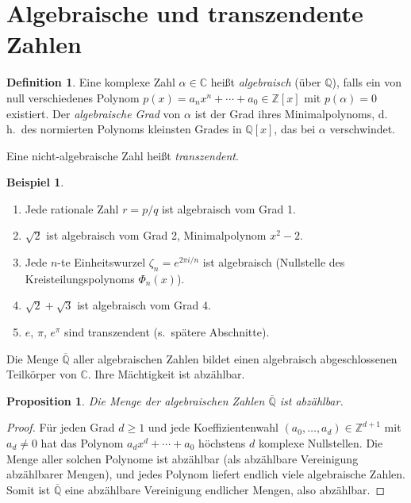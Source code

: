 \documentclass[12pt,a4paper]{amsart}
\newtheorem{proposition}[theorem]{Proposition}
\theoremstyle{definition}
\newtheorem{definition}[theorem]{Definition}
\newtheorem{beispiel}[theorem]{Beispiel}
\begin{document}
\section{Algebraische und transzendente Zahlen}
\label{sec:alg-transz}

\begin{definition}
Eine komplexe Zahl $\alpha \in \mathbb{C}$ heißt \emph{algebraisch} (über
$\mathbb{Q}$), falls ein von null verschiedenes Polynom $p(x) = a_n x^n +
\cdots + a_0 \in \mathbb{Z}[x]$ mit $p(\alpha) = 0$ existiert. Der
\emph{algebraische Grad} von $\alpha$ ist der Grad ihres Minimalpolynoms,
d.\,h.\ des normierten Polynoms kleinsten Grades in $\mathbb{Q}[x]$, das bei
$\alpha$ verschwindet.

Eine nicht-algebraische Zahl heißt \emph{transzendent}.
\end{definition}

\begin{beispiel}
\begin{enumerate}[label=(\roman*)]
  \item Jede rationale Zahl $r = p/q$ ist algebraisch vom Grad 1.
  \item $\sqrt{2}$ ist algebraisch vom Grad 2, Minimalpolynom $x^2 - 2$.
  \item Jede $n$-te Einheitswurzel $\zeta_n = e^{2\pi i/n}$ ist algebraisch
        (Nullstelle des Kreisteilungspolynoms $\Phi_n(x)$).
  \item $\sqrt{2} + \sqrt{3}$ ist algebraisch vom Grad 4.
  \item $e$, $\pi$, $e^\pi$ sind transzendent (s.\ spätere Abschnitte).
\end{enumerate}
\end{beispiel}

Die Menge $\overline{\mathbb{Q}}$ aller algebraischen Zahlen bildet einen
algebraisch abgeschlossenen Teilkörper von $\mathbb{C}$. Ihre Mächtigkeit
ist abzählbar.

\begin{proposition}
Die Menge der algebraischen Zahlen $\overline{\mathbb{Q}}$ ist abzählbar.
\end{proposition}
\begin{proof}
Für jeden Grad $d \geq 1$ und jede Koeffizientenwahl $(a_0, \ldots, a_d) \in
\mathbb{Z}^{d+1}$ mit $a_d \neq 0$ hat das Polynom $a_d x^d + \cdots + a_0$
höchstens $d$ komplexe Nullstellen. Die Menge aller solchen Polynome ist
abzählbar (als abzählbare Vereinigung abzählbarer Mengen), und jedes Polynom
liefert endlich viele algebraische Zahlen. Somit ist $\overline{\mathbb{Q}}$
eine abzählbare Vereinigung endlicher Mengen, also abzählbar.
\end{proof}
\end{document}
